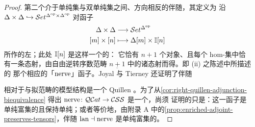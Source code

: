 \begin{proof}
第二个介于单纯集与双单纯集之间、方向相反的伴随，其\trLeftAdjoint{}定义为
沿 \trYonedaEmbedding{} $\Delta\times\Delta\hookrightarrow\mathcal{S}et^{\Delta^{\mathrm{op}}\times\Delta^{\mathrm{op}}}$ 对函子
\[
\begin{aligned}
\Delta\times\Delta &\longrightarrow \mathcal{S}et^{\Delta^{\mathrm{op}}}\\
{[m]}\times{[n]} &\longmapsto \Delta[m]\times\mathbb{I}[n]
\end{aligned}
\]
所作的左\trKanExtension；此处 $\mathbb{I}[n]$ 是这样一个\trGroupoid{}的\trNerve：
它恰有 $n+1$ 个对象、且每个 hom-集中恰有一条态射，由自由逆转序数范畴
$\underline{n+1}$ 中的诸态射而得。\trRightAdjoint{}即 (ii) 之陈述中所描述的
那个相应的「$\mathrm{nerve}$」函子。Joyal 与 Tierney 还证明了伴随
\begin{center}
\end{center}
相对于\trCompleteSegalSpaces{}与拟范畴的模型结构是一个 Quillen \trEquivalence
\cite[4.12]{bib64}。为了从\cref{cor:right-quillen-adjunction-biequivalence}
得出 $\mathrm{nerve}\colon\mathcal{Q}\mathcal{C}at\to\mathcal{C}\mathcal{S}\mathcal{S}$ 是一个\trCosmologicalBiequivalence，尚须
证明的只是：这一函子是单纯富集的且保持单纯\trCotensor；或者等价地，由附录 A
中的\cref{prop:enriched-adjoint-preserves-tensors}，伴随
$\mathrm{lan}\dashv\mathrm{nerve}$ 是单纯富集的。


\end{proof}
